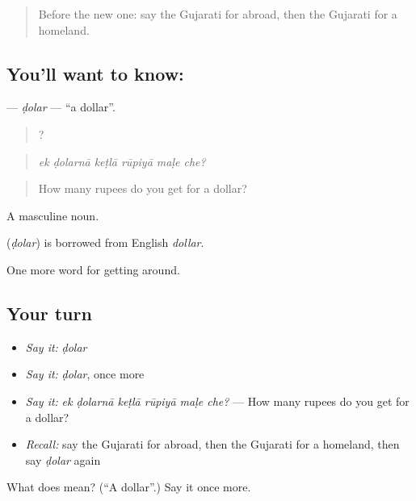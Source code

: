 \label{lesson:GU-C407-dolar}



\begin{quote}
Before the new one: say the Gujarati for abroad, then the Gujarati for a homeland.
\end{quote}

\subsection*{You'll want to know: }
\textbf{} — \emph{ḍolar} — \textquotedblleft{}a dollar\textquotedblright{}.

\begin{quote}
     ?
\end{quote}

\begin{quote}
\emph{ek ḍolarnā keṭlā rūpiyā maḷe che?}
\end{quote}

\begin{quote}
How many rupees do you get for a dollar?
\end{quote}

A masculine noun.

\begin{cousinweb}
\textbf{} (\emph{ḍolar}) is borrowed from English \emph{dollar}.
\end{cousinweb}

\begin{grammarlens}[title={What you've built}]
One more word for getting around.
\end{grammarlens}

\subsection*{Your turn}
\begin{itemize}
\raggedright
  \item \emph{Say it:} \emph{ḍolar}
  \item \emph{Say it:} \emph{ḍolar}, once more
  \item \emph{Say it:} \emph{ek ḍolarnā keṭlā rūpiyā maḷe che?} — How many rupees do you get for a dollar?
  \item \emph{Recall:} say the Gujarati for abroad, then the Gujarati for a homeland, then say \emph{ḍolar} again
\end{itemize}

\begin{tcolorbox}[breakable,colback=teal!4,colframe=teal!35!black,title={Before you move on}]
What does  mean? (\textquotedblleft{}A dollar\textquotedblright{}.) Say it once more.
\end{tcolorbox}
